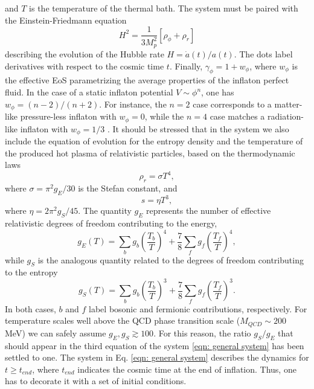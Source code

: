 \documentclass[%
aps,prd,nofootinbib,showkeys,a4paper,10pt
]{revtex4-2}
\begin{document}
and $T$ is the temperature of the thermal bath.
The system must be paired with the Einstein-Friedmann equation
\begin{equation}
H^2=\frac{1}{3M^2_p}\left[\rho_{\phi}+\rho_r\right] 
\end{equation}
describing the evolution of the Hubble rate $H=\dot{a}(t)/a(t)$.
The dots label derivatives with respect to the cosmic time $t$.
Finally, $\gamma_{\phi}=1+w_{\phi}$, where $w_{\phi}$ is the effective EoS parametrizing the average properties
of the inflaton perfect fluid. In the case of a static inflaton potential $V \sim \phi^n$, one has $w_{\phi}=(n-2)/(n+2)$.  
For instance, the $n=2$ case corresponds to a matter-like pressure-less
inflaton with $w_{\phi}=0$, while the $n=4$ case matches a radiation-like inflaton with $w_{\phi}=1/3$ \cite{11,28,29}.
It should be stressed that in the system we also include the equation of evolution for the entropy density
and the temperature of the produced hot plasma of relativistic particles, based on the thermodynamic laws
\begin{equation}
\rho_r= \sigma T^4 ,
\end{equation}
where $\sigma=\pi^2 g_E/30$ is the Stefan constant, and 
\begin{equation}
s=\eta T^3 ,
\end{equation}
where $\eta=2\pi^2 g_S/45$. The quantity $g_E$ represents the number of effective relativistic degrees of freedom contributing to the energy,
\begin{equation}
g_{E}(T)=\sum_{b} g_{b}\left( \frac{T_b}{T}\right)^4 + \frac{7}{8}\sum_{f} g_{f}\left(\frac{T_f}{T}\right)^4,
\end{equation} 
while $g_S$ is the analogous quantity related to the degrees of freedom contributing to the entropy
\begin{equation}
g_{S}(T)=\sum_{b} g_{b}\left( \frac{T_b}{T}\right)^3 + \frac{7}{8}\sum_{f} g_{f}\left(\frac{T_f}{T}\right)^3.
\end{equation}
In both cases, $b$ and $f$ label bosonic and fermionic contributions, respectively. 
For temperature scales well above the QCD phase transition scale ($M_{QCD}\sim 200$ MeV)
we can safely assume $g_E, g_S \gtrsim 100$.  
For this reason, the ratio $g_S/g_E$ that should appear in the third equation of the system \eqref{eqn: general system} has been settled to one.
The system in Eq. \eqref{eqn: general system} describes the dynamics for $t\geq t_{end}$, where $t_{end}$ indicates the cosmic time at the end of inflation. 
Thus, one has to decorate it with a set of initial conditions. 
\end{document}
